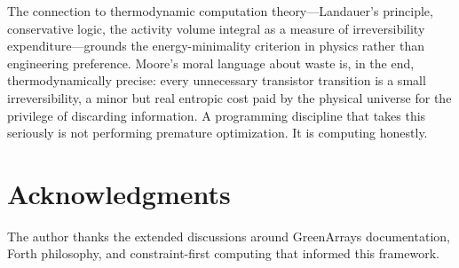 \documentclass[11pt, a4paper]{article}
\begin{document}
The connection to thermodynamic computation theory---Landauer's principle,
conservative logic, the activity volume integral as a measure of irreversibility
expenditure---grounds the energy-minimality criterion in physics rather than
engineering preference. Moore's moral language about waste is, in the end,
thermodynamically precise: every unnecessary transistor transition is a small
irreversibility, a minor but real entropic cost paid by the physical universe
for the privilege of discarding information. A programming discipline that takes
this seriously is not performing premature optimization. It is computing honestly.

\section*{Acknowledgments}

The author thanks the extended discussions around GreenArrays documentation,
Forth philosophy, and constraint-first computing that informed this framework.
\end{document}
